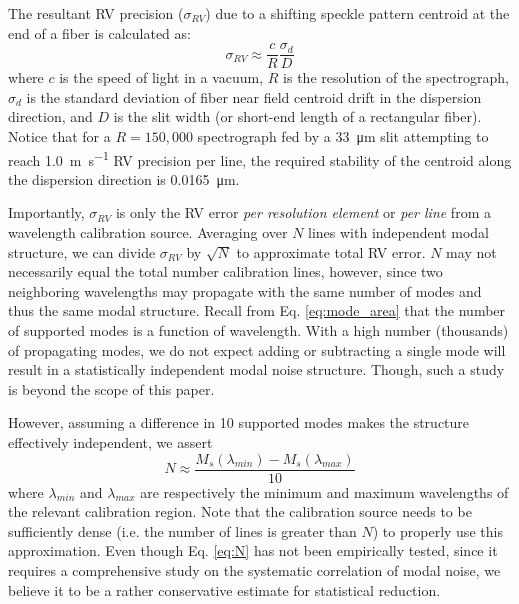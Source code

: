 \documentclass[twocolumn]{emulateapj}
\begin{document}
The resultant RV precision ($\sigma_{RV}$) due to a shifting speckle pattern centroid at the end of a fiber is calculated as:
\begin{equation}
\sigma_{RV} \approx \frac{c}{R} \frac{\sigma_d}{D}
\label{eq:rv_error}
\end{equation}
where $c$ is the speed of light in a vacuum, $R$ is the resolution of the spectrograph, $\sigma_d$ is the standard deviation of fiber near field centroid drift in the dispersion direction, and $D$ is the slit width (or short-end length of a rectangular fiber). Notice that for a $R=150,000$ spectrograph fed by a \SI{33}{\micro\meter} slit attempting to reach \SI{1.0}{\meter\per\second} RV precision per line, the required stability of the centroid along the dispersion direction is \SI{0.0165}{\micro\meter}.

Importantly, $\sigma_{RV}$ is only the RV error \textit{per resolution element} or \textit{per line} from a wavelength calibration source. Averaging over $N$ lines with independent modal structure, we can divide $\sigma_{RV}$ by $\sqrt{N}$ to approximate total RV error. $N$ may not necessarily equal the total number calibration lines, however, since two neighboring wavelengths may propagate with the same number of modes and thus the same modal structure. Recall from Eq. \ref{eq:mode_area} that the number of supported modes is a function of wavelength. With a high number (thousands) of propagating modes, we do not expect adding or subtracting a single mode will result in a statistically independent modal noise structure. Though, such a study is beyond the scope of this paper.

However, assuming a difference in 10 supported modes makes the structure effectively independent, we assert
\begin{equation}
N \approx \frac{M_s(\lambda_{min}) - M_s(\lambda_{max})}{10}
\label{eq:N}
\end{equation}
where $\lambda_{min}$ and $\lambda_{max}$ are respectively the minimum and maximum wavelengths of the relevant calibration region. Note that the calibration source needs to be sufficiently dense (i.e. the number of lines is greater than $N$) to properly use this approximation. Even though Eq. {\ref{eq:N}} has not been empirically tested, since it requires a comprehensive study on the systematic correlation of modal noise, we believe it to be a rather conservative estimate for statistical reduction.
\end{document}
